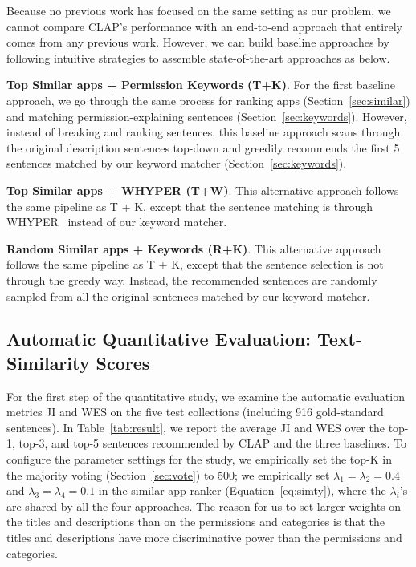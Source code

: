 Because no previous work has focused on the same setting as our problem, we cannot compare CLAP's performance with an end-to-end approach that entirely comes from any previous work. 
However, we can build baseline approaches by following intuitive strategies to assemble state-of-the-art approaches as below.

\textbf{Top Similar apps + Permission Keywords (T+K)}. 
For the first baseline approach, we go through the same process for ranking apps (Section~\ref{sec:similar}) and matching permission-explaining sentences (Section~\ref{sec:keywords}). 
However, instead of breaking and ranking sentences, this baseline approach scans through the original description sentences top-down and greedily recommends the first 5 sentences matched by our keyword matcher (Section~\ref{sec:keywords}). 

\textbf{Top Similar apps + WHYPER (T+W)}. 
This alternative approach follows the same pipeline as T + K, except that the sentence matching is through WHYPER~\cite{conf/uss/PanditaXYEX13} instead of our keyword matcher. 

\textbf{Random Similar apps + Keywords (R+K)}. 
This alternative approach follows the same pipeline as T + K, except that the sentence selection is not through the greedy way. 
Instead, the recommended sentences are randomly sampled from all the original sentences matched by our keyword matcher. 


\subsection{Automatic Quantitative Evaluation: Text-Similarity Scores}
\label{sec:text}

For the first step of the quantitative study, we examine the automatic evaluation metrics JI and WES on the five test collections (including 916 gold-standard sentences). 
In Table~\ref{tab:result}, we report the average JI and WES over the top-1, top-3, and top-5 sentences recommended by CLAP and the three baselines. To configure the 
parameter settings for the study, we empirically set the top-K in the majority voting (Section~\ref{sec:vote}) to 500; we empirically set $\lambda_1=\lambda_2=0.4$ and $\lambda_3=\lambda_4=0.1$ in the similar-app ranker (Equation~\ref{eq:simty}), where the $\lambda_i$'s are shared by all the four approaches. 
The reason for us to set larger weights on the titles and  descriptions than on the permissions and categories is that the titles and  descriptions have more discriminative power than the permissions and categories. 

